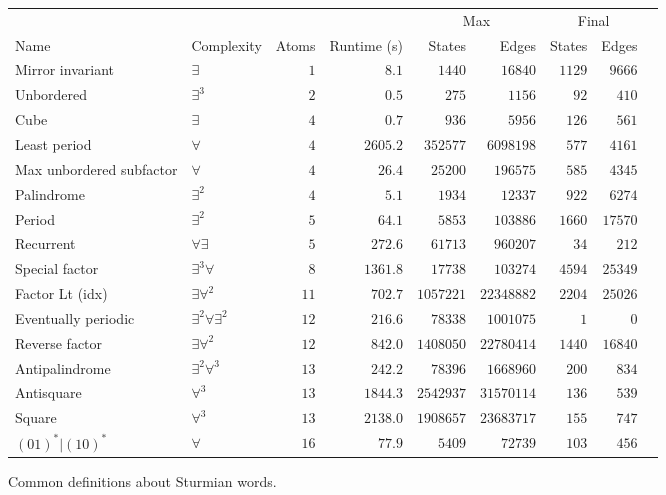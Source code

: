 \begin{figure}
    \centering
    \hspace{-3em}
    \vspace{-1em}
    \footnotesize
    \begin{tabular}{l|l|r|r|r|r|r|r|r|}
        & & & & \multicolumn{2}{c}{Max} & \multicolumn{2}{c}{Final} \\
        Name & Complexity & Atoms & Runtime (s) & States & Edges & States & Edges \\ \hline
Mirror invariant & $\exists$ & $1$ & $8.1$ & $1440$ & $16840$ & $1129$ & $9666$ \\
Unbordered & $\exists^3$ & $2$ & $0.5$ & $275$ & $1156$ & $92$ & $410$ \\
Cube & $\exists$ & $4$ & $0.7$ & $936$ & $5956$ & $126$ & $561$ \\
Least period & $\forall$ & $4$ & $2605.2$ & $352577$ & $6098198$ & $577$ & $4161$ \\
Max unbordered subfactor & $\forall$ & $4$ & $26.4$ & $25200$ & $196575$ & $585$ & $4345$ \\
Palindrome & $\exists^2$ & $4$ & $5.1$ & $1934$ & $12337$ & $922$ & $6274$ \\
Period & $\exists^2$ & $5$ & $64.1$ & $5853$ & $103886$ & $1660$ & $17570$ \\
Recurrent & $\forall\exists$ & $5$ & $272.6$ & $61713$ & $960207$ & $34$ & $212$ \\
Special factor & $\exists^3\forall$ & $8$ & $1361.8$ & $17738$ & $103274$ & $4594$ & $25349$ \\
Factor Lt (idx) & $\exists \forall^2$ & $11$ & $702.7$ & $1057221$ & $22348882$ & $2204$ & $25026$ \\
Eventually periodic & $\exists^2\forall\exists^2$ & $12$ & $216.6$ & $78338$ & $1001075$ & $1$ & $0$ \\
Reverse factor & $\exists \forall^2$ & $12$ & $842.0$ & $1408050$ & $22780414$ & $1440$ & $16840$ \\
Antipalindrome & $\exists^2\forall^3$ & $13$ & $242.2$ & $78396$ & $1668960$ & $200$ & $834$ \\
Antisquare & $\forall^3$ & $13$ & $1844.3$ & $2542937$ & $31570114$ & $136$ & $539$ \\
Square & $\forall^3$ & $13$ & $2138.0$ & $1908657$ & $23683717$ & $155$ & $747$ \\
$(01)^*|(10)^*$ & $\forall$ & $16$ & $77.9$ & $5409$ & $72739$ & $103$ & $456$ \\
    \end{tabular}
    \vspace{-0.5em}
    \caption{Common definitions about Sturmian words.}
    \vspace{-2em}
    \label{fig:def-performance-table}
\end{figure}

